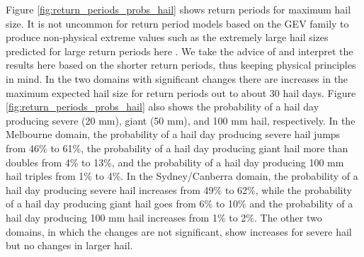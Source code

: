\documentclass[]{agujournal2019}\usepackage[]{graphicx}\usepackage[]{xcolor}
\begin{document}
Figure \ref{fig:return_periods_probs_hail} shows return periods for maximum hail size. It is not uncommon for return period models based on the GEV family to produce non-physical extreme values such as the extremely large hail sizes predicted for large return periods here \cite[p. 66]{Coles_2001}. We take the advice of  and interpret the results here based on the shorter return periods, thus keeping physical principles in mind. In the two domains with significant changes there are increases in the maximum expected hail size for return periods out to about 30 hail days. Figure \ref{fig:return_periods_probs_hail} also shows the probability of a hail day producing severe (20 mm), giant (50 mm), and 100 mm hail, respectively. In the Melbourne domain, the probability of a hail day producing severe hail jumps from 46\% to 61\%, the probability of a hail day producing giant hail more than doubles from 4\% to 13\%, and the probability of a hail day producing 100 mm hail triples from 1\% to 4\%. In the Sydney/Canberra domain, the probability of a hail day producing severe hail increases from 49\% to 62\%, while the probability of a hail day producing giant hail goes from 6\% to 10\% and the probability of a hail day producing 100 mm hail increases from 1\% to 2\%. The other two domains, in which the changes are not significant, show increases for severe hail but no changes in larger hail.
\end{document}
